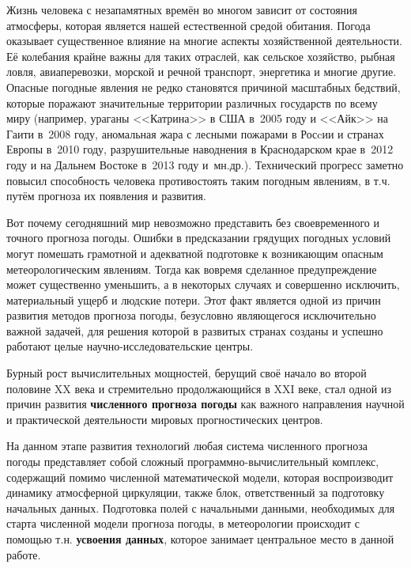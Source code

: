 {\actuality} 
Жизнь  человека с незапамятных времён во многом зависит от состояния атмосферы, которая является нашей естественной средой обитания. Погода оказывает существенное влияние на многие аспекты хозяйственной деятельности. Её колебания крайне важны для таких отраслей, как сельское хозяйство, рыбная ловля, авиаперевозки, морской и речной транспорт, энергетика и многие другие. Опасные погодные явления не редко становятся причиной масштабных бедствий, которые поражают значительные территории различных государств по всему миру (например, ураганы <<Катрина>> в США в~2005 году и <<Айк>> на Гаити в~2008 году, аномальная жара с лесными пожарами в Росcии и странах Европы в~2010 году, разрушительные наводнения в Краснодарском крае в~2012 году и на Дальнем Востоке в~2013 году и~мн.\:др.). Технический прогресс заметно повысил способность человека противостоять таким погодным явлениям, в т.\:ч. путём прогноза их появления и развития.

Вот почему сегодняшний мир невозможно представить без своевременного и точного прогноза погоды. Ошибки в предсказании грядущих погодных условий могут помешать грамотной и адекватной подготовке к возникающим опасным метеорологическим явлениям. Тогда как вовремя сделанное предупреждение может существенно уменьшить, а в некоторых случаях и совершенно исключить, материальный ущерб и людские потери. Этот факт является одной из причин развития методов прогноза погоды, безусловно являющегося исключительно важной задачей, для решения которой в развитых странах созданы и успешно работают целые научно-исследовательские центры.

Бурный рост вычислительных мощностей, берущий своё начало во второй половине XX века и стремительно продолжающийся в XXI веке, стал одной из причин развития \textbf{численного прогноза погоды} как важного направления научной и практической деятельности мировых прогностических центров.

На данном этапе развития технологий любая система численного прогноза погоды представляет собой сложный программно-вычислительный комплекс, содержащий помимо численной математической модели, которая воспроизводит динамику атмосферной циркуляции, также блок, ответственный за подготовку начальных данных. Подготовка полей с начальными данными, необходимых для старта численной модели прогноза погоды, в метеорологии происходит с помощью т.\:н. \textbf{усвоения данных}, которое занимает центральное место в данной работе.

